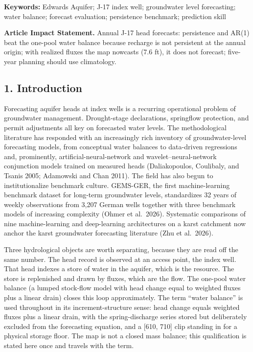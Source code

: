 \documentclass[11pt]{article}
\begin{document}
\begin{abstract}
\textbf{Implications.} For annual J-17 head forecasts, simple
persistence and a univariate AR(1) are difficult to beat; the one-pool
balance, given the year's fluxes, nowcasts rather than forecasts.
Multi-year planning should prefer climatological baselines to persisted
recharge.

\end{abstract}

\textbf{Keywords:} Edwards Aquifer; J-17 index well; groundwater level
forecasting; water balance; forecast evaluation; persistence benchmark;
prediction skill

\textbf{Article Impact Statement.} Annual J-17 head forecasts:
persistence and AR(1) beat the one-pool water balance because recharge
is not persistent at the annual origin; with realized fluxes the map
nowcasts (7.6 ft), it does not forecast; five-year planning should use
climatology.

\subsection{1. Introduction}\label{introduction}

Forecasting aquifer heads at index wells is a recurring operational
problem of groundwater management. Drought-stage declarations,
springflow protection, and permit adjustments all key on forecasted
water levels. The methodological literature has responded with an
increasingly rich inventory of groundwater-level forecasting models,
from conceptual water balances to data-driven regressions and,
prominently, artificial-neural-network and wavelet--neural-network
conjunction models trained on measured heads (Daliakopoulos, Coulibaly,
and Tsanis 2005; Adamowski and Chan 2011). The field has also begun to
institutionalize benchmark culture. GEMS-GER, the first machine-learning
benchmark dataset for long-term groundwater levels, standardizes 32
years of weekly observations from 3,207 German wells together with three
benchmark models of increasing complexity (Ohmer et al.~2026).
Systematic comparisons of nine machine-learning and deep-learning
architectures on a karst catchment now anchor the karst groundwater
forecasting literature (Zhu et al.~2026).

Three hydrological objects are worth separating, because they are read
off the same number. The head record is observed at an access point, the
index well. That head indexes a store of water in the aquifer, which is
the resource. The store is replenished and drawn by fluxes, which are
the flow. The one-pool water balance (a lumped stock-flow model with
head change equal to weighted fluxes plus a linear drain) closes this
loop approximately. The term ``water balance'' is used throughout in its
increment-structure sense: head change equals weighted fluxes plus a
linear drain, with the spring-discharge series stored but deliberately
excluded from the forecasting equation, and a {[}610, 710{]} clip
standing in for a physical storage floor. The map is not a closed mass
balance; this qualification is stated here once and travels with the
term.
\end{document}
